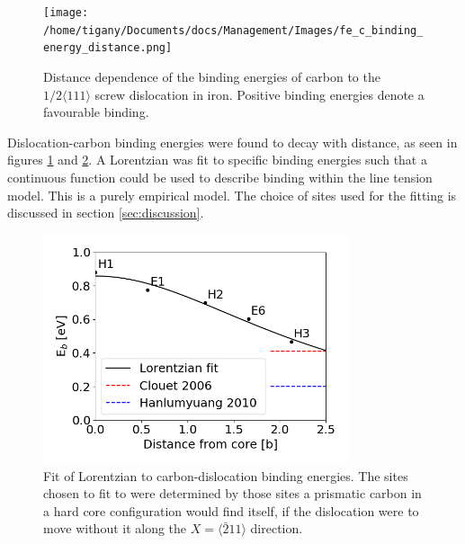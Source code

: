 \documentclass[a4paper,11pt]{article}
\begin{document}
\begin{figure}[htbp]

\texttt{[image: /home/tigany/Documents/docs/Management/Images/fe\_c\_binding\_energy\_distance.png]}
\caption{Distance dependence of the binding energies of carbon to the \(1/2\langle 111 \rangle\) screw dislocation in iron. Positive binding energies denote a favourable binding. \label{distancedep}}
\end{figure}

Dislocation-carbon binding energies were found to decay with distance, as seen in figures
\ref{distancedep} and \ref{lorentzianfit}. A Lorentzian was fit to specific binding energies such
that a continuous function could be used to describe binding within
the line tension model. This is a purely empirical model. The
choice of sites used for the fitting is discussed in section \ref{sec:discussion}.




\begin{figure}[htbp]

\includegraphics[width=0.8\textwidth]{Images/fe-c_lorentzian_fit_binding_energies_quadrupole.png}
\caption{Fit of Lorentzian to carbon-dislocation binding energies. The sites chosen to fit to were determined by those sites a prismatic carbon in a hard core configuration would find itself, if the dislocation were to move without it along the \(X = \langle\bar{2}11\rangle\) direction. \label{lorentzianfit}}
\end{figure}
\end{document}
